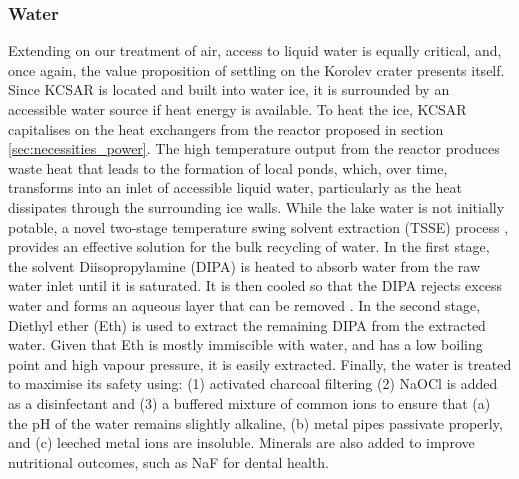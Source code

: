 \documentclass[fleqn,10pt]{Stylesheet} %
\begin{document}
\subsubsection{Water}
\label{sec:necessities_water}

Extending on our treatment of air, access to liquid water is equally critical, and, once again, the value proposition of settling on the Korolev crater presents itself. Since KCSAR is located and built into water ice, it is surrounded by an accessible water source if heat energy is available. To heat the ice, KCSAR capitalises on the heat exchangers from the reactor proposed in section \ref{sec:necessities_power}. The high temperature output from the reactor produces waste heat that leads to the formation of local ponds, which, over time, transforms into an inlet of accessible liquid water, particularly as the heat dissipates through the surrounding ice walls. While the lake water is not initially potable, a novel two-stage temperature swing solvent extraction (TSSE) process \cite{ChanheeBoo2019}, provides an effective solution for the bulk recycling of water. In the first stage, the solvent Diisopropylamine (DIPA) is heated to absorb water from the raw water inlet until it is saturated. It is then cooled so that the DIPA rejects excess water and forms an aqueous layer that can be removed \cite{CRC_84Ed}. In the second stage, Diethyl ether (Eth) is used to extract the remaining DIPA from the extracted water. Given that Eth is mostly immiscible with water, and has a low boiling point and high vapour pressure, it is easily extracted. Finally, the water is treated to maximise its safety using: (1) activated charcoal filtering (2) NaOCl is added as a disinfectant and (3) a buffered mixture of common ions to ensure that (a) the pH of the water remains slightly alkaline, (b) metal pipes passivate properly, and (c) leeched metal ions are insoluble. Minerals are also added to improve nutritional outcomes, such as NaF for dental health.
\end{document}
